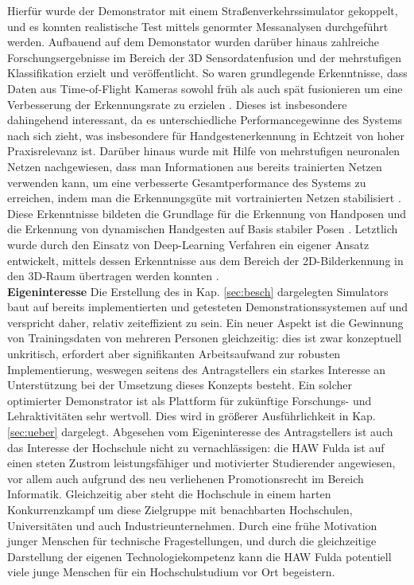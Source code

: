 \documentclass[11pt]{article}
\begin{document}
%
Hierfür wurde der Demonstrator mit einem Straßenverkehrssimulator gekoppelt, und es konnten realistische Test mittels genormter Messanalysen durchgeführt werden. Aufbauend auf dem Demonstator wurden darüber hinaus zahlreiche Forschungsergebnisse im Bereich der 3D Sensordatenfusion und der mehrstufigen Klassifikation erzielt und veröffentlicht. So waren grundlegende Erkenntnisse, dass Daten aus Time-of-Flight Kameras sowohl früh als auch spät fusionieren um eine Verbesserung der Erkennungsrate zu erzielen \cite{kopinskineural}. Dieses ist insbesondere dahingehend interessant, da es unterschiedliche Performancegewinne des Systems nach sich zieht, was insbesondere für Handgestenerkennung in Echtzeit von hoher Praxisrelevanz ist. Darüber hinaus wurde mit Hilfe von mehrstufigen neuronalen Netzen nachgewiesen, dass man Informationen aus bereits trainierten Netzen verwenden kann, um eine verbesserte Gesamtperformance des Systems zu erreichen, indem man die Erkennungsgüte mit vortrainierten Netzen stabilisiert \cite{kopinski2015pragmatic}. Diese Erkenntnisse bildeten die Grundlage für die Erkennung von Handposen und die Erkennung von dynamischen Handgesten auf Basis stabiler Posen \cite{kopinski2015real}. Letztlich wurde durch den Einsatz von Deep-Learning Verfahren ein eigener Ansatz entwickelt, mittels dessen Erkenntnisse aus dem Bereich der 2D-Bilderkennung in den 3D-Raum übertragen werden konnten \cite{kopinski2016x3,gepperth2017d}.\\

\textbf {Eigeninteresse} Die Erstellung des in Kap. \ref{sec:besch} dargelegten Simulators baut auf bereits implementierten und getesteten Demonstrationssystemen auf und verspricht daher, relativ zeiteffizient zu sein. Ein neuer Aspekt ist die Gewinnung von Trainingsdaten von mehreren Personen gleichzeitig: dies ist zwar konzeptuell unkritisch, erfordert aber signifikanten Arbeitsaufwand zur robusten Implementierung, weswegen seitens des Antragstellers ein starkes Interesse an Unterstützung bei der Umsetzung dieses Konzepts besteht. Ein solcher optimierter Demonstrator ist als Plattform für zukünftige Forschungs- und Lehraktivitäten sehr wertvoll. Dies wird in größerer Ausführlichkeit in Kap. \ref{sec:ueber} dargelegt. Abgesehen vom Eigeninteresse des Antragstellers ist auch das Interesse der Hochschule nicht zu vernachlässigen: die HAW Fulda ist auf einen steten Zustrom leistungsfähiger und motivierter Studierender angewiesen, vor allem auch aufgrund des neu verliehenen Promotionsrecht im Bereich Informatik. Gleichzeitig aber steht die Hochschule in einem harten Konkurrenzkampf um diese Zielgruppe mit benachbarten Hochschulen, Universitäten und auch Industrieunternehmen. Durch eine frühe Motivation junger Menschen für technische Fragestellungen, und durch die gleichzeitige Darstellung der eigenen Technologiekompetenz kann die HAW Fulda potentiell viele junge Menschen für ein Hochschulstudium vor Ort begeistern.
%
\renewcommand{\thesection}{6}
\end{document}
